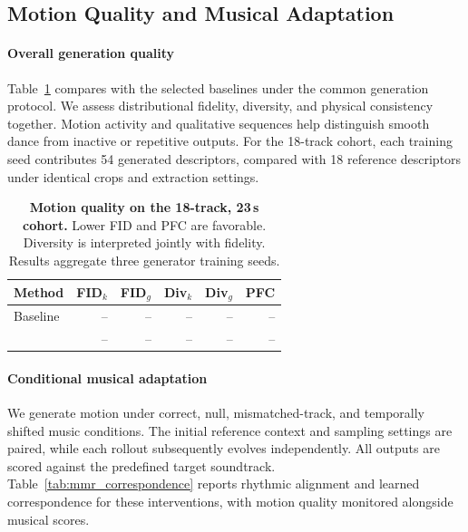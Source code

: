 
\subsection{Motion Quality and Musical Adaptation}
\label{sec:matching_quality}

\paragraph{Overall generation quality}
Table~\ref{tab:motion_quality} compares \method{} with
the selected baselines under the common generation protocol.
We assess distributional fidelity, diversity, and physical
consistency together.
Motion activity and qualitative sequences help distinguish
smooth dance from inactive or repetitive outputs.
For the 18-track cohort, each training seed contributes
54 generated descriptors, compared with 18 reference
descriptors under identical crops and extraction settings.

\begin{table}[t]
    \centering
    \small
    \caption{
    \textbf{Motion quality on the 18-track, 23\,s cohort.}
    Lower FID and PFC are favorable.
    Diversity is interpreted jointly with fidelity.
    Results aggregate three generator training seeds.
    }
    \label{tab:motion_quality}
    \setlength{\tabcolsep}{3pt}
    \begin{tabular}{@{}lrrrrr@{}}
        \toprule
        Method
        & FID$_k$ & FID$_g$
        & Div$_k$ & Div$_g$ & PFC \\
        \midrule
        Baseline & -- & -- & -- & -- & -- \\
        \method{} & -- & -- & -- & -- & -- \\
        \bottomrule
    \end{tabular}
\end{table}


\paragraph{Conditional musical adaptation}
We generate motion under correct, null, mismatched-track,
and temporally shifted music conditions.
The initial reference context and sampling settings are
paired, while each rollout subsequently evolves independently.
All outputs are scored against the predefined target
soundtrack.
Table~\ref{tab:mmr_correspondence} reports rhythmic alignment
and learned correspondence for these interventions,
with motion quality monitored alongside musical scores.

